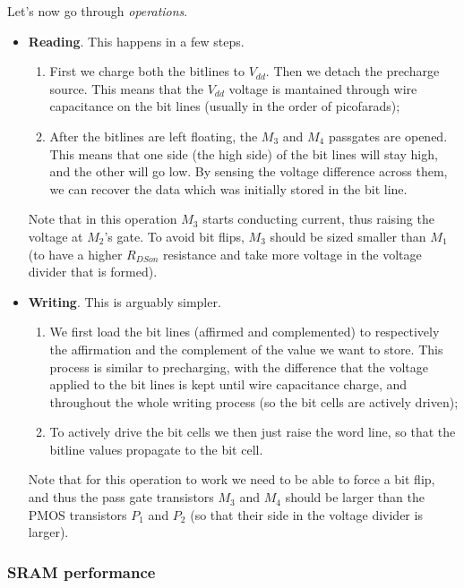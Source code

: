 \documentclass[a4paper,11pt]{article}
\begin{document}
Let's now go through \textit{operations}.
\begin{itemize}
	\item \textbf{Reading}. This happens in a few steps.

	      \begin{enumerate}
		      \item First we charge both the bitlines to $V_{dd}$. Then we detach the precharge source. This means that the $V_{dd}$ voltage is mantained through wire capacitance on the bit lines (usually in the order of picofarads);
		      \item After the bitlines are left floating, the $M_3$ and $M_4$ passgates are opened. This means that one side (the high side) of the bit lines will stay high, and the other will go low. By sensing the voltage difference across them, we can recover the data which was initially stored in the bit line.
	      \end{enumerate}

	      Note that in this operation $M_3$ starts conducting current, thus raising the voltage at $M_2$'s gate. To avoid bit flips, $M_3$ should be sized smaller than $M_1$ (to have a higher $R_{DSon}$ resistance and take more voltage in the voltage divider that is formed).

	\item \textbf{Writing}. This is arguably simpler.

	      \begin{enumerate}
		      \item We first load the bit lines (affirmed and complemented) to respectively the affirmation and the complement of the value we want to store. This process is similar to precharging, with the difference that the voltage applied to the bit lines is kept until wire capacitance charge, and throughout the whole writing process (so the bit cells are actively driven);
		      \item To actively drive the bit cells we then just raise the word line, so that the bitline values propagate to the bit cell.
	      \end{enumerate}

	      Note that for this operation to work we need to be able to force a bit flip, and thus the pass gate transistors $M_3$ and $M_4$ should be larger than the PMOS transistors $P_1$ and $P_2$ (so that their side in the voltage divider is larger).
\end{itemize}

\subsubsection{SRAM performance}
\end{document}
